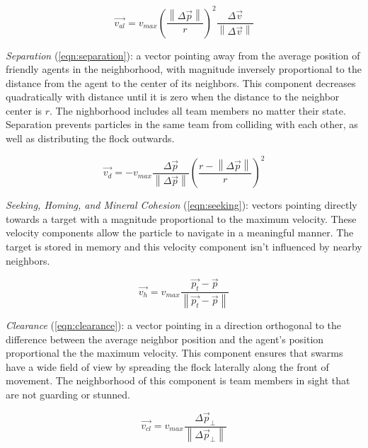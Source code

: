 \documentclass[12pt,journal,compsoc]{IEEEtran}
\begin{document}
\begin{equation}
    \vec { v_{ al } } =v_{ max }{\left( \frac { \left\| \Delta \vec { p } \right\|  }{ r }  \right)}^2\frac {\Delta \vec{v}} { \left\| \Delta \vec{v} \right\| }
    \label{eqn:alignment}
\end{equation}

\textit{Separation} (\ref{eqn:separation}): a vector pointing away from the average position of friendly agents in the neighborhood, with magnitude inversely proportional to the distance from the agent to the center of its neighbors. This component decreases quadratically with distance until it is zero when the distance to the neighbor center is $r$. The nighborhood includes all team members no matter their state. Separation prevents particles in the same team from colliding with each other, as well as distributing the flock outwards.

\begin{equation}
    \vec { v_{ d } } =-v_{ max }\frac {\Delta \vec{p}} { \left\| \Delta \vec{p} \right\| }{\left( \frac { r - \left\| \Delta \vec { p } \right\|  }{ r }  \right)}^2
    \label{eqn:separation}
\end{equation}

\textit{Seeking, Homing, and Mineral Cohesion} (\ref{eqn:seeking}): vectors pointing directly towards a target with a magnitude proportional to the maximum velocity. These velocity components allow the particle to navigate in a  meaningful manner. The target is stored in memory and this velocity component isn't influenced by nearby neighbors.

\begin{equation}
    \vec{v_h} = v_{max} \frac {\vec{p_t} - \vec p} { \left\| \vec{p_t} - \vec p \right\| }
    \label{eqn:seeking}
\end{equation}

\textit{Clearance} (\ref{eqn:clearance}): a vector pointing in a direction orthogonal to the difference between the average neighbor position and the agent's position proportional the the maximum velocity. This component ensures that swarms have a wide field of view by spreading the flock laterally along the front of movement. The neighborhood of this component is team members in sight that are not guarding or stunned.

\begin{equation}
    \vec{v_{cl}} = v_{max} \frac {\Delta \vec p_\perp } { \left\| \Delta \vec p_\perp  \right\| }
    \label{eqn:clearance}
\end{equation}
\end{document}

